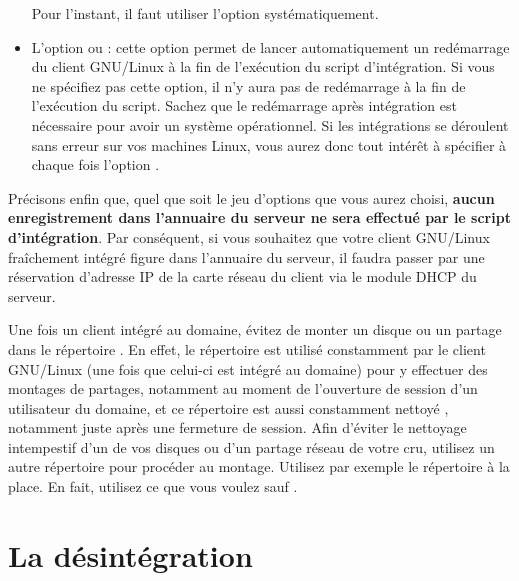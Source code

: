 \begin{itemize}
\begin{alerte}
Pour l'instant, il faut utiliser l'option 
systématiquement.
\end{alerte}


\item L'option  ou  :
cette option permet de lancer automatiquement un redémarrage du client GNU/Linux
à la fin de l'exécution du script d'intégration. Si vous ne spécifiez pas cette option,
il n'y aura pas de redémarrage à la fin de l'exécution du script.
Sachez que le redémarrage après intégration est nécessaire pour avoir un système 
opérationnel. Si les intégrations se déroulent sans erreur sur vos machines
Linux, vous aurez donc tout intérêt à spécifier à chaque fois l'option
.

\end{itemize}


Précisons enfin que, quel que soit le jeu d'options que vous aurez choisi,
\textbf{aucun enregistrement dans l'annuaire du serveur ne sera effectué par le
script d'intégration}. Par conséquent, si vous souhaitez que votre client GNU/Linux
fraîchement intégré figure dans l'annuaire du serveur, il faudra passer par une
réservation d'adresse IP de la carte réseau du client
via le module DHCP du serveur.


\begin{alerte}
Une fois un client intégré au domaine, évitez de monter un disque
ou un partage dans le répertoire . En effet, le
répertoire  est utilisé constamment par le client
GNU/Linux (une fois que celui-ci est
intégré au domaine)
pour y effectuer des montages de partages, notamment au moment
de l'ouverture de session d'un utilisateur du domaine, et ce
répertoire est aussi constamment \og nettoyé \fg{}, notamment juste
après une fermeture de session. Afin d'éviter le \og nettoyage \fg{}
intempestif d'un de vos disques ou d'un partage réseau de votre cru,
utilisez un autre répertoire
pour procéder au montage. Utilisez par exemple le répertoire 
à la place. En fait, utilisez ce que vous voulez sauf .
\end{alerte}



\section{La \og désintégration \fg}
\label{desintegration}

